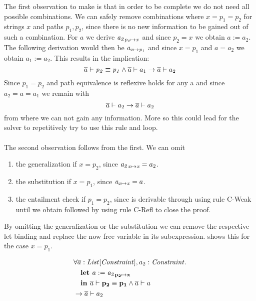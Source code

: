 The first observation to make is that in order to be complete
we do not need all possible combinations.
We can safely remove combinations where $x = p_1 = p_2$ for strings $x$ and paths $p_1, p_2$,
since there is no new information to be gained out of such a combination.
For $a$ we derive $\mathit{a_2}_{\mathit{p_2} \mapsto \mathit{x}}$
and since $p_2 = x$ we obtain $a := a_2$.
The following derivation would then be $\mathit{a}_{\mathit{x} \mapsto \mathit{p_1}}$
and since $x = p_1$ and $a = a_2$ we obtain $a_1 := a_2$.
This results in the implication:
\[ \overline{a} \vdash \mathit{p_2} \equiv \mathit{p_1} \land \overline{a} \vdash a_1 \rightarrow \overline{a} \vdash a_2 \]
Since $p_1 = p_2$ and path equivalence is reflexive
 holds for any \ovl a
and since $a_2 = a = a_1$ we remain with
\[ \overline{a} \vdash a_2 \rightarrow \overline{a} \vdash a_2 \]
from where we can not gain any information.
More so this could lead for the solver to repetitively try to use this rule
and loop.\\
\\
The second observation follows from the first.
We can omit
\begin{enumerate}
    \item the generalization  if $x = p_2$,
          since $\mathit{a_2}_{\mathit{x} \mapsto \mathit{x}} = a_2$.
    \item the substitution  if $x = p_1$,
          since $\mathit{a}_{\mathit{x} \mapsto \mathit{x}} = a$.
    \item the entailment check  if $p_1 = p_2$,
          since  is derivable through using rule C-Weak
          until we obtain  followed
          by using rule C-Refl to close the proof.
\end{enumerate}
By omitting the generalization or the substitution
we can remove the respective let binding
and replace the now free variable in its subexpression.
 shows this for the case $x = p_1$.
\begin{example}[Optimzed subst rule with $x = p_1$]
\label{ex:subst-optimzed}
\begin{align*}
&\forall \overline{a}: \mathit{List[\mathit{Constraint}]}, a_2: \mathit{Constraint}.\\
&\quad \textbf{let } a := \mathit{a_2}_{\mathit{\mathbf{p_2}} \mapsto \mathit{\mathbf{x}}}\\
&\quad \textbf{in }
       \overline{a} \vdash \mathit{\mathbf{p_2}} \equiv \mathit{\mathbf{p_1}}
       \land
       \overline{a} \vdash a\\
&\rightarrow \overline{a} \vdash a_2
\end{align*}
\end{example}
%
